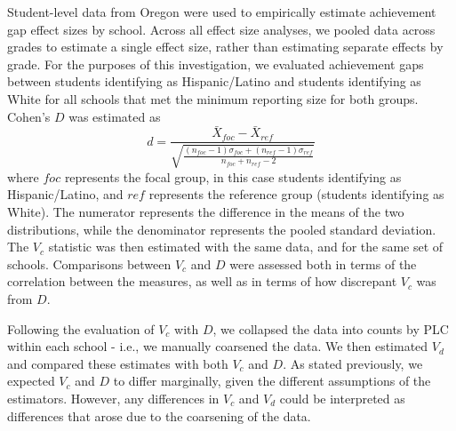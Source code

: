 \documentclass[man, fleqn, noextraspace]{apa6}
\theoremstyle{definition}
\theoremstyle{definition}
\theoremstyle{definition}
\theoremstyle{remark}
\begin{document}
Student-level data from Oregon were used to empirically estimate
achievement gap effect sizes by school. Across all effect size analyses,
we pooled data across grades to estimate a single effect size, rather
than estimating separate effects by grade. For the purposes of this
investigation, we evaluated achievement gaps between students
identifying as Hispanic/Latino and students identifying as White for all
schools that met the minimum reporting size for both groups. Cohen's
\(D\) was estimated as \begin{equation}
d = \frac{\bar{X}_{foc} - \bar{X}_{ref}}
        {\sqrt{\frac{(n_{foc} - 1)\sigma_{foc} + (n_{ref} - 1)\sigma_{ref}}
                  {n_{foc} + n_{ref} - 2}}}
\end{equation} where \(foc\) represents the focal group, in this case
students identifying as Hispanic/Latino, and \(ref\) represents the
reference group (students identifying as White). The numerator
represents the difference in the means of the two distributions, while
the denominator represents the pooled standard deviation. The \(V_c\)
statistic was then estimated with the same data, and for the same set of
schools. Comparisons between \(V_c\) and \(D\) were assessed both in
terms of the correlation between the measures, as well as in terms of
how discrepant \(V_c\) was from \(D\).

Following the evaluation of \(V_c\) with \(D\), we collapsed the data
into counts by PLC within each school - i.e., we manually coarsened the
data. We then estimated \(V_d\) and compared these estimates with both
\(V_c\) and \(D\). As stated previously, we expected \(V_c\) and \(D\)
to differ marginally, given the different assumptions of the estimators.
However, any differences in \(V_c\) and \(V_d\) could be interpreted as
differences that arose due to the coarsening of the data.
\end{document}
